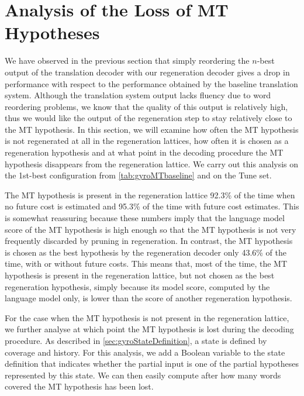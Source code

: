 \section{Analysis of the Loss of MT Hypotheses}
\label{sec:gyroTransErrorAnalysis}


We have observed in the previous section that simply reordering the $n$-best output
of the translation decoder with our regeneration decoder gives a drop
in performance with respect to the performance obtained by the
baseline translation system.
Although the translation system output lacks fluency due to word reordering
problems, we know that the quality of this output is relatively high, thus
we would like the output of the regeneration step to stay relatively close
to the MT hypothesis.
In this section, we will examine how often the MT
hypothesis is not regenerated at all in the regeneration lattices, how often it is
chosen as a regeneration hypothesis and at what point in the decoding procedure
the MT hypothesis disappears from the regeneration lattice.
We carry out this analysis on the 1st-best configuration from
\autoref{tab:gyroMTbaseline} and on the Tune set.

The MT hypothesis is present in the regeneration lattice
92.3\% of the time when no future cost is estimated and
95.3\% of the time with future cost estimates. This is somewhat reassuring
because these numbers imply that the language model score of the MT
hypothesis is high enough so that the MT hypothesis is not very frequently discarded
by pruning in regeneration.
In contrast, the MT hypothesis is chosen as the
best hypothesis by the regeneration decoder only 43.6\% of the time, with
or without future costs. This means that, most of the time, the MT
hypothesis is present in the regeneration lattice, but not chosen as
the best regeneration hypothesis, simply because its model score, computed
by the language model only, is lower than the score of another
regeneration hypothesis.

For the case when the MT hypothesis is not present in the regeneration
lattice, we further analyse at which point the MT hypothesis is lost
during the decoding procedure. As described in \autoref{sec:gyroStateDefinition},
a state is defined by coverage and history. For this analysis, we
add a Boolean variable to the state definition that indicates whether
the partial input is one of the partial hypotheses represented by this state.
We can then easily compute after how many words covered the MT hypothesis
has been lost.

